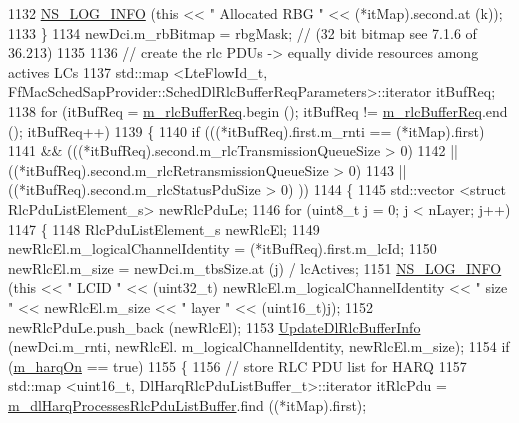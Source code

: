 \begin{DoxyCode}
1132           \hyperlink{group__logging_gafbd73ee2cf9f26b319f49086d8e860fb}{NS\_LOG\_INFO} (\textcolor{keyword}{this} << \textcolor{stringliteral}{" Allocated RBG "} << (*itMap).second.at (k));
1133         \}
1134       newDci.m\_rbBitmap = rbgMask; \textcolor{comment}{// (32 bit bitmap see 7.1.6 of 36.213)}
1135 
1136       \textcolor{comment}{// create the rlc PDUs -> equally divide resources among actives LCs}
1137       std::map <LteFlowId\_t, FfMacSchedSapProvider::SchedDlRlcBufferReqParameters>::iterator itBufReq;
1138       \textcolor{keywordflow}{for} (itBufReq = \hyperlink{classns3_1_1TdBetFfMacScheduler_a2c9685f472af05693a869d043fc1d35c}{m\_rlcBufferReq}.begin (); itBufReq != 
      \hyperlink{classns3_1_1TdBetFfMacScheduler_a2c9685f472af05693a869d043fc1d35c}{m\_rlcBufferReq}.end (); itBufReq++)
1139         \{
1140           \textcolor{keywordflow}{if} (((*itBufReq).first.m\_rnti == (*itMap).first)
1141               && (((*itBufReq).second.m\_rlcTransmissionQueueSize > 0)
1142                   || ((*itBufReq).second.m\_rlcRetransmissionQueueSize > 0)
1143                   || ((*itBufReq).second.m\_rlcStatusPduSize > 0) ))
1144             \{
1145               std::vector <struct RlcPduListElement\_s> newRlcPduLe;
1146               \textcolor{keywordflow}{for} (uint8\_t j = 0; j < nLayer; j++)
1147                 \{
1148                   RlcPduListElement\_s newRlcEl;
1149                   newRlcEl.m\_logicalChannelIdentity = (*itBufReq).first.m\_lcId;
1150                   newRlcEl.m\_size = newDci.m\_tbsSize.at (j) / lcActives;
1151                   \hyperlink{group__logging_gafbd73ee2cf9f26b319f49086d8e860fb}{NS\_LOG\_INFO} (\textcolor{keyword}{this} << \textcolor{stringliteral}{" LCID "} << (uint32\_t) newRlcEl.m\_logicalChannelIdentity 
      << \textcolor{stringliteral}{" size "} << newRlcEl.m\_size << \textcolor{stringliteral}{" layer "} << (uint16\_t)j);
1152                   newRlcPduLe.push\_back (newRlcEl);
1153                   \hyperlink{classns3_1_1TdBetFfMacScheduler_af71a8df6d7681bda2678aff1c77985fb}{UpdateDlRlcBufferInfo} (newDci.m\_rnti, newRlcEl.
      m\_logicalChannelIdentity, newRlcEl.m\_size);
1154                   \textcolor{keywordflow}{if} (\hyperlink{classns3_1_1TdBetFfMacScheduler_a8de90c082c621bf8d664fff8cf370acb}{m\_harqOn} == \textcolor{keyword}{true})
1155                     \{
1156                       \textcolor{comment}{// store RLC PDU list for HARQ}
1157                       std::map <uint16\_t, DlHarqRlcPduListBuffer\_t>::iterator itRlcPdu =  
      \hyperlink{classns3_1_1TdBetFfMacScheduler_a066bceddaca3ed4a25974ada3aba3028}{m\_dlHarqProcessesRlcPduListBuffer}.find ((*itMap).first);

\end{DoxyCode}
